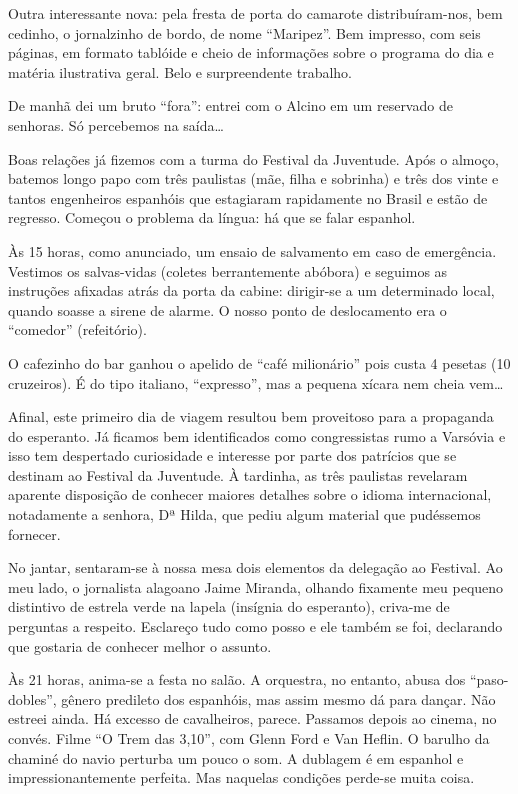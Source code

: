 Outra interessante nova: pela fresta de porta do camarote distribuíram-nos, bem cedinho, o jornalzinho de bordo, de nome ``Maripez''. Bem impresso, com seis páginas, em formato tablóide e cheio de informações sobre o programa do dia e matéria ilustrativa geral. Belo e surpreendente trabalho.

De manhã dei um bruto ``fora'': entrei com o Alcino em um reservado de senhoras. Só percebemos na saída\ldots

Boas relações já fizemos com a turma do Festival da Juventude. Após o almoço, batemos longo papo com três paulistas (mãe, filha e sobrinha) e três dos vinte e tantos engenheiros espanhóis que estagiaram rapidamente no Brasil e estão de regresso. Começou o problema da língua: há que se falar espanhol.

Às 15 horas, como anunciado, um ensaio de salvamento em caso de emergência. Vestimos os salvas-vidas (coletes berrantemente abóbora) e seguimos as instruções afixadas atrás da porta da cabine: dirigir-se a um determinado local, quando soasse a sirene de alarme. O nosso ponto de deslocamento era o ``comedor'' (refeitório).

O cafezinho do bar ganhou o apelido de ``café milionário'' pois custa 4 pesetas (10 cruzeiros). É do tipo italiano, ``expresso'', mas a pequena xícara nem cheia vem\ldots

Afinal, este primeiro dia de viagem resultou bem proveitoso para a propaganda do esperanto. Já ficamos bem identificados como congressistas rumo a Varsóvia e isso tem despertado curiosidade e interesse por parte dos patrícios que se destinam ao Festival da Juventude. À tardinha, as três paulistas revelaram aparente disposição de conhecer maiores detalhes sobre o idioma internacional, notadamente a senhora, Dª Hilda, que pediu algum material que pudéssemos fornecer.

No jantar, sentaram-se à nossa mesa dois elementos da delegação ao Festival. Ao meu lado, o jornalista alagoano Jaime Miranda, olhando fixamente meu pequeno distintivo de estrela verde na lapela (insígnia do esperanto), criva-me de perguntas a respeito. Esclareço tudo como posso e ele também se foi, declarando que gostaria de conhecer melhor o assunto.

Às 21 horas, anima-se a festa no salão. A orquestra, no entanto, abusa dos ``paso-dobles'', gênero predileto dos espanhóis, mas assim mesmo dá para dançar. Não estreei ainda. Há excesso de cavalheiros, parece. Passamos depois ao cinema, no convés. Filme ``O Trem das 3,10'', com Glenn Ford e Van Heflin. O barulho da chaminé do navio perturba um pouco o som. A dublagem é em espanhol e impressionantemente perfeita. Mas naquelas condições perde-se muita coisa.

